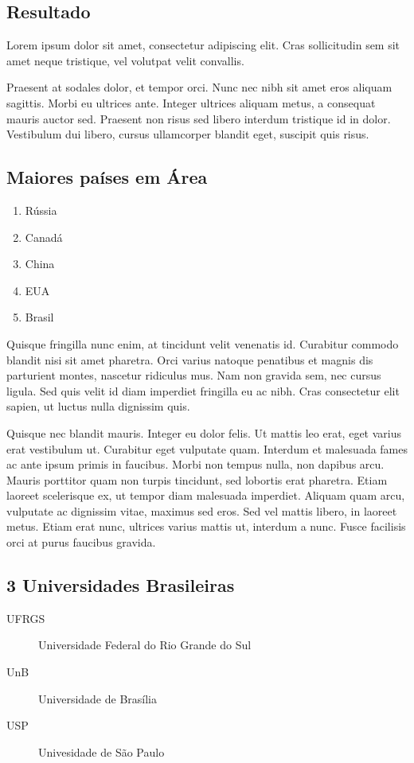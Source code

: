 \begin{center}
  \section{Resultado}
  Lorem ipsum dolor sit amet, consectetur adipiscing elit. 
  Cras sollicitudin sem sit amet neque tristique, vel volutpat velit convallis.    
\end{center}

Praesent at sodales dolor, et tempor orci. 
Nunc nec nibh sit amet eros aliquam sagittis. Morbi eu ultrices ante. 
Integer ultrices aliquam metus, a consequat mauris auctor sed. 
Praesent non risus sed libero interdum tristique id in dolor. 
Vestibulum dui libero, cursus ullamcorper blandit eget, suscipit quis risus.

\subsection*{Maiores países em Área}
\begin{enumerate}
    \item Rússia
    \item Canadá
    \item China
    \item EUA
    \item Brasil
\end{enumerate}

Quisque fringilla nunc enim, at tincidunt velit venenatis id. 
Curabitur commodo blandit nisi sit amet pharetra. 
Orci varius natoque penatibus et magnis dis parturient montes, nascetur ridiculus mus. 
Nam non gravida sem, nec cursus ligula. Sed quis velit id diam imperdiet fringilla eu ac nibh. 
Cras consectetur elit sapien, ut luctus nulla dignissim quis.

Quisque nec blandit mauris. Integer eu dolor felis. 
Ut mattis leo erat, eget varius erat vestibulum ut. Curabitur eget vulputate quam. 
Interdum et malesuada fames ac ante ipsum primis in faucibus. 
Morbi non tempus nulla, non dapibus arcu. 
Mauris porttitor quam non turpis tincidunt, sed lobortis erat pharetra. 
Etiam laoreet scelerisque ex, ut tempor diam malesuada imperdiet. 
Aliquam quam arcu, vulputate ac dignissim vitae, maximus sed eros. 
Sed vel mattis libero, in laoreet metus. 
Etiam erat nunc, ultrices varius mattis ut, interdum a nunc. 
Fusce facilisis orci at purus faucibus gravida.

\subsection*{3 Universidades Brasileiras}
\begin{description}
    \item[UFRGS] Universidade Federal do Rio Grande do Sul
    \item[UnB] Universidade de Brasília
    \item[USP] Univesidade de São Paulo
\end{description}

